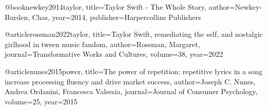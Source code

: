 @book{newkey2014taylor,
  title={Taylor Swift - The Whole Story},
  author={Newkey-Burden, Chas},
  year={2014},
  publisher={Harpercollins Publishers}
}

@article{rossman2022taylor,
  title={Taylor Swift, remediating the self, and nostalgic girlhood in tween music fandom},
  author={Rossman, Margaret},
  journal={Transformative Works and Cultures},
  volume={38},
  year={2022}
}

@article{nunes2015power,
  title={The power of repetition: repetitive lyrics in a song increase processing fluency and drive market success},
  author={Joseph C. Nunes, Andrea Ordanini, Francesca Valsesia},
  journal={Journal of Consumer Psychology},
  volume={25},
  year={2015}
}

